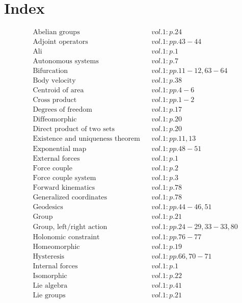 \documentclass[a4paper]{article}
\begin{document}
 
\section*{Index} 
\allowdisplaybreaks 
\begin{align*} 
&\text{Abelian groups}&& vol. 1: p. 24\\
&\text{Adjoint operators}&& vol. 1: pp. 43-44\\
&\text{Ali}&& vol. 1: p. 1\\
&\text{Autonomous systems}&& vol. 1: p. 7\\
&\text{Bifurcation}&& vol. 1: pp. 11-12, 63-64\\
&\text{Body velocity}&& vol. 1: p. 38\\
&\text{Centroid of area}&& vol. 1: pp. 4-6\\
&\text{Cross product}&& vol. 1: pp. 1-2\\
&\text{Degrees of freedom}&& vol. 1: p. 17\\
&\text{Diffeomorphic}&& vol. 1: p. 20\\
&\text{Direct product of two sets}&& vol. 1: p. 20\\
&\text{Existence and uniqueness theorem}&& vol. 1: pp. 11, 13\\
&\text{Exponential map}&& vol. 1: pp. 48-51\\
&\text{External forces}&& vol. 1: p. 1\\
&\text{Force couple}&& vol. 1: p. 2\\
&\text{Force couple system}&& vol. 1: p. 3\\
&\text{Forward kinematics}&& vol. 1: p. 78\\
&\text{Generalized coordinates}&& vol. 1: p. 78\\
&\text{Geodesics}&& vol. 1: pp. 44-46, 51\\
&\text{Group}&& vol. 1: p. 21\\
&\text{Group, left/right action}&& vol. 1: pp. 24-29, 33-33, 80\\
&\text{Holonomic constraint}&& vol. 1: pp. 76-77\\
&\text{Homeomorphic}&& vol. 1: p. 19\\
&\text{Hysteresis}&& vol. 1: pp. 66, 70-71\\
&\text{Internal forces}&& vol. 1: p. 1\\
&\text{Isomorphic}&& vol. 1: p. 22\\
&\text{Lie algebra}&& vol. 1: p. 41\\
&\text{Lie groups}&& vol. 1: p. 21\\

\end{align*}
\end{document}
